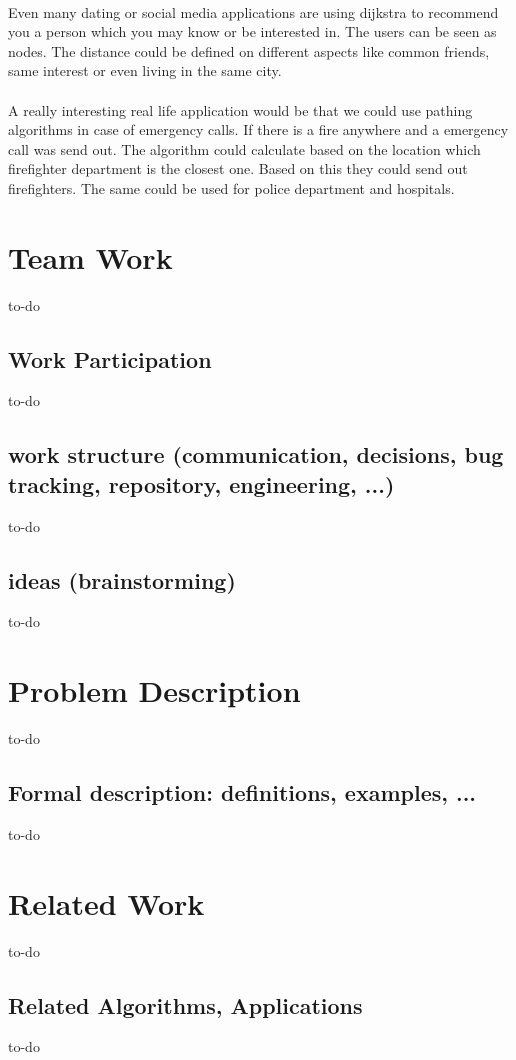 \documentclass[a4paper,12pt]{article}
\begin{document}
\\Even many dating or social media applications are using dijkstra to recommend you a person which you may know or be interested in. The users can be seen as nodes. The distance could be defined on different aspects like common friends, same interest or even living in the same city.\\
\\A really interesting real life application would be that we could use pathing algorithms in case of emergency calls. If there is a fire anywhere and a emergency call was send out. The algorithm could calculate based on the location which firefighter department is the closest one. Based on this they could send out firefighters. The same could be used for police department and hospitals.

\section{Team Work}
to-do
\subsection{Work Participation}
to-do

\subsection{work structure (communication, decisions, bug tracking, repository, engineering, ...)}
to-do

\subsection{ideas (brainstorming)}
to-do

\section{Problem Description}
to-do
\subsection{Formal description: definitions, examples, ...}
to-do

\section{Related Work}
to-do
\subsection{Related Algorithms, Applications}
to-do
\end{document}
